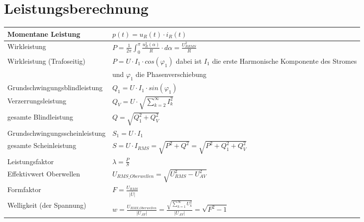 \section{Leistungsberechnung}
\begin{tabu}{|l|l|}
  \hline
  Momentane Leistung
  	& $p(t) = u_{R}(t) \cdot i_{R}(t)$\\
  \hline
  Wirkleistung
  	& $P = \frac{1}{2\pi}\int_{0}^{\pi}\frac{u_{R}^2(\alpha)}{R} \cdot d\alpha = \frac{U_{R RMS}^2}{R}$\\
  \hline
  Wirkleistung (Trafoseitig)
  	& $P = U \cdot I_{1} \cdot cos(\varphi_{1})$ \newline
  		dabei ist $I_{1}$ die erste Harmonische Komponente des Stromes \\
  		& und $\varphi_{1}$ die Phasenverschiebung \\
  \hline
  Grundschwingungsblindleistung
  	& $Q_{1} = U \cdot I_{1} \cdot sin(\varphi_{1})$\\
  \hline
  Verzerrungsleistung
  	& $Q_{V} =  U \cdot \sqrt{\sum_{k = 2}^{\infty}I_{k}^2}$\\
  \hline
  gesamte Blindleistung
  	& $Q = \sqrt{Q_{1}^2 + Q_{V}^2}$\\
  \hline
  Grundschwingungsscheinleistung
  	& $S_{1} = U \cdot I_{1}$\\
  \hline
  gesamte Scheinleistung
  	& $S = U \cdot I_{RMS} = \sqrt{P^2 + Q^2} = \sqrt{P^2 + Q_{1}^2 + Q_{V}^2}$\\
  \hline
  Leistungsfaktor
  	& $\lambda = \frac{P}{S}$\\
  \hline
  Effektivwert Oberwellen
    & $U_{RMS\_Oberwellen} = \sqrt{U_{RMS}^2 - U_{AV}^2}$\\
  \hline
  Formfaktor
    & $F = \frac{U_{RMS}}{\overline{|U|}}$\\
  \hline
  Welligkeit (der Spannung)
  	& $w = \frac{U_{RMS\_Oberwellen}}{|U_{AV}|}= \frac{\sqrt{\sum_{k = 1}^{\infty}U_{k}^2}}{|U_{AV}|} = \sqrt{F^2-1}$\\
  \hline
\end{tabu}